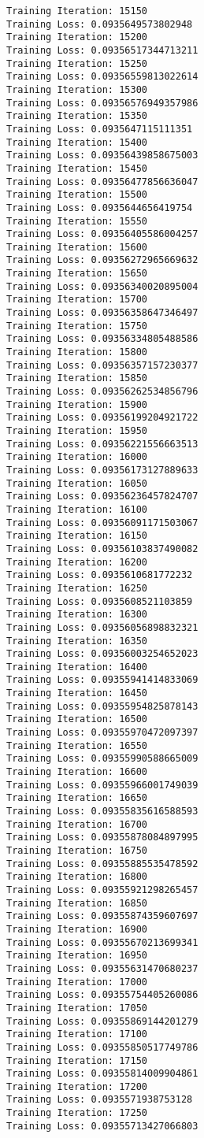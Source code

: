 \documentclass[11pt]{article}
\begin{document}
\begin{Verbatim}[commandchars=\\\{\}]
Training Iteration: 15150
Training Loss: 0.0935649573802948
Training Iteration: 15200
Training Loss: 0.09356517344713211
Training Iteration: 15250
Training Loss: 0.09356559813022614
Training Iteration: 15300
Training Loss: 0.09356576949357986
Training Iteration: 15350
Training Loss: 0.0935647115111351
Training Iteration: 15400
Training Loss: 0.09356439858675003
Training Iteration: 15450
Training Loss: 0.09356477856636047
Training Iteration: 15500
Training Loss: 0.0935644656419754
Training Iteration: 15550
Training Loss: 0.09356405586004257
Training Iteration: 15600
Training Loss: 0.09356272965669632
Training Iteration: 15650
Training Loss: 0.09356340020895004
Training Iteration: 15700
Training Loss: 0.09356358647346497
Training Iteration: 15750
Training Loss: 0.09356334805488586
Training Iteration: 15800
Training Loss: 0.09356357157230377
Training Iteration: 15850
Training Loss: 0.09356262534856796
Training Iteration: 15900
Training Loss: 0.09356199204921722
Training Iteration: 15950
Training Loss: 0.09356221556663513
Training Iteration: 16000
Training Loss: 0.09356173127889633
Training Iteration: 16050
Training Loss: 0.09356236457824707
Training Iteration: 16100
Training Loss: 0.09356091171503067
Training Iteration: 16150
Training Loss: 0.09356103837490082
Training Iteration: 16200
Training Loss: 0.0935610681772232
Training Iteration: 16250
Training Loss: 0.0935608521103859
Training Iteration: 16300
Training Loss: 0.09356056898832321
Training Iteration: 16350
Training Loss: 0.09356003254652023
Training Iteration: 16400
Training Loss: 0.09355941414833069
Training Iteration: 16450
Training Loss: 0.09355954825878143
Training Iteration: 16500
Training Loss: 0.09355970472097397
Training Iteration: 16550
Training Loss: 0.09355990588665009
Training Iteration: 16600
Training Loss: 0.09355966001749039
Training Iteration: 16650
Training Loss: 0.09355835616588593
Training Iteration: 16700
Training Loss: 0.09355878084897995
Training Iteration: 16750
Training Loss: 0.09355885535478592
Training Iteration: 16800
Training Loss: 0.09355921298265457
Training Iteration: 16850
Training Loss: 0.09355874359607697
Training Iteration: 16900
Training Loss: 0.09355670213699341
Training Iteration: 16950
Training Loss: 0.09355631470680237
Training Iteration: 17000
Training Loss: 0.09355754405260086
Training Iteration: 17050
Training Loss: 0.09355869144201279
Training Iteration: 17100
Training Loss: 0.09355850517749786
Training Iteration: 17150
Training Loss: 0.09355814009904861
Training Iteration: 17200
Training Loss: 0.0935571938753128
Training Iteration: 17250
Training Loss: 0.09355713427066803

\end{Verbatim}
\end{document}
